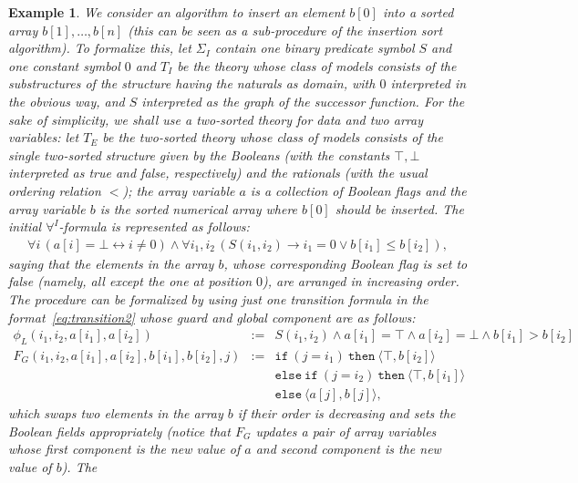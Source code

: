 \documentclass{LMCS}
\theoremstyle{plain}\newtheorem{assumption}[thm]{Assumption}
\theoremstyle{plain}\newtheorem{proposition}[thm]{Proposition}
\theoremstyle{plain}\newtheorem{property}[thm]{Property}
\theoremstyle{plain}\newtheorem{example}[thm]{Example}
\theoremstyle{plain}\newtheorem{claim}[thm]{Claim}
\theoremstyle{plain}\newtheorem{lemma}[thm]{Lemma}
\begin{document}
\begin{example}\em
  \label{ex:only}
  We consider an algorithm to insert an element $b[0]$ into a sorted
  array $b[1], \dots, b[n]$ (this can be seen as a sub-procedure of
  the insertion sort algorithm).  To formalize this, let $\Sigma_I$
  contain one binary predicate symbol $S$ and one constant symbol $0$
  and $T_I$ be the theory whose class of models consists of the
  substructures of the structure having the naturals as domain, with
  $0$ interpreted in the obvious way, and $S$ interpreted as the graph
  of the successor function.  For the sake of simplicity, we shall use
  a two-sorted theory for data and two array variables: let $T_E$ be
  the two-sorted theory whose class of models consists of the single
  two-sorted structure given by the Booleans (with the constants
  $\top, \bot$ interpreted as true and false, respectively) and the
  rationals (with the usual ordering relation $<$); the array variable
  $a$ is a collection of Boolean flags and the array variable $b$ is
  the sorted numerical array where $b[0]$ should be inserted.  The
  initial $\forall^I$-formula is represented as follows:
  \begin{eqnarray*}
    \forall i\, (a[i]=\bot \leftrightarrow i\neq 0) \wedge
    \forall i_1, i_2 \,(S(i_1,i_2) \to i_1=0 \vee b[i_1]\leq b[i_2]) ,
  \end{eqnarray*}
  saying that the elements in the array $b$, whose corresponding
  Boolean flag is set to false (namely, all except the one at position
  $0$), are arranged in increasing order.  The procedure can be
  formalized by using just one transition formula in the
  format~\ref{eq:transition2} whose guard and global component are as
  follows:
  \begin{eqnarray*}
    \phi_L(i_1,i_2,a[i_1],a[i_2]) & := &
    S(i_1, i_2) \wedge
    a[i_1]=\top \wedge
    a[i_2]=\bot \wedge
    b[i_1] > b[i_2]  \\
F_G(i_1, i_2, a[i_1], a[i_2],  b[i_1], b[i_2], j) & := & \mathtt{if}~(j= i_1)~\mathtt{then}~\langle \top, b[i_2]\rangle \\
         &&    \mathtt{else~if}~(j=i_2)~\mathtt{then}~\langle \top, b[i_1]\rangle \\
         &&    \mathtt{else}~\langle a[j], b[j]\rangle ,
  \end{eqnarray*}
  which swaps two elements in the array $b$ if their order is
  decreasing and sets the Boolean fields appropriately (notice that
  $F_G$ updates a pair of array variables whose first component is the
  new value of $a$ and second component is the new value of $b$).  The

\end{example}
\end{document}
